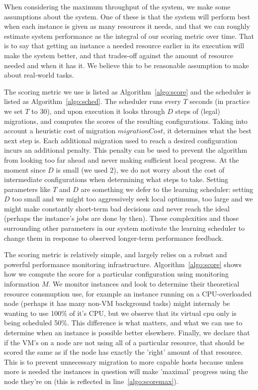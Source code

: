 When considering the maximum throughput of the system, we make some assumptions
about the system.  One of these is that the system will perform best when each
instance is given as many resources it needs, and that we can roughly estimate
system performance as the integral of our scoring metric over time.  That is to
say that getting an instance a needed resource earlier in its execution will
make the system better, and that trades-off against the amount of resource
needed and when it has it.  We believe this to be reasonable assumption to make
about real-world tasks.



The scoring metric we use is listed as Algorithm~\ref{algo:score} and the scheduler is
listed as Algorithm~\ref{algo:sched}.  The scheduler runs every $T$ seconds (in
practice we set $T$ to 30), and upon execution it looks through $D$ steps of
(legal) migrations, and computes the scores of the resulting configurations.
Taking into account a heuristic cost of migration $migrationCost$, it determines
what the best next step is.  Each additional migration used to reach a desired
configuration incurs an additional penalty.   This penalty can be used to
prevent the algorithm from looking too far ahead and never making sufficient
local progress.  At the moment since $D$ is small (we used $2$), we do not worry
about the cost of intermediate configurations when determining what steps to
take.  Setting parameters like $T$ and $D$ are something we defer to the
learning scheduler: setting $D$ too small and we might too aggressively seek
local optimums, too large and we might make constantly short-term bad decisions
and never reach the ideal (perhaps the instance's jobs are done by then).  These
complexities and those surrounding other parameters in our system motivate the
learning scheduler to change them in response to observed longer-term
performance feedback.

The scoring metric is relatively simple, and largely relies on a robust and
powerful performance monitoring infrastructure.  Algorithm~\ref{algo:score}
shows how we compute the score for a particular configuration using monitoring
information $M$.  We monitor instances and look to determine their theoretical
resource consmuption use, for example an instance running on a CPU-overloaded
node (perhaps it has many non-VM background tasks) might internaly be wanting to
use 100\% of it's CPU, but we observe that its virtual cpu only is being
scheduled 50\%.  This difference is what matters, and what we can use to
determine when an instance is possible better elsewhere.  Finally, we declare
that if the VM's on a node are not using all of a particular resource, that
should be scored the same as if the node has exactly the 'right' amount of that
resource.  This is to prevent unnecessary migration to more capable hosts
because unless more is needed the instances in question will make 'maximal'
progress using the node they're on (this is reflected in
line~\ref{algo:scoremax}).

